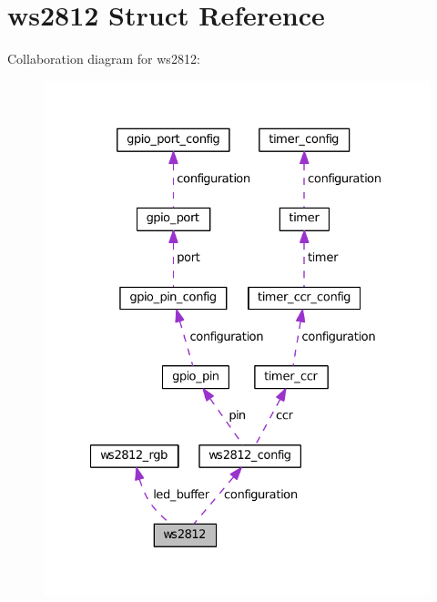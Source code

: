 \hypertarget{structws2812}{}\section{ws2812 Struct Reference}
\label{structws2812}


Collaboration diagram for ws2812\+:\nopagebreak
\begin{figure}[H]
\begin{center}
\leavevmode
\includegraphics[width=327pt]{structws2812__coll__graph}
\end{center}
\end{figure}
